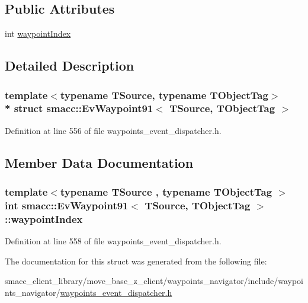 \subsection*{Public Attributes}
\begin{DoxyCompactItemize}
\item 
int \hyperlink{structsmacc_1_1EvWaypoint91_a104a2ec166f873d644de8a6fdc0253db}{waypoint\+Index}
\end{DoxyCompactItemize}


\subsection{Detailed Description}
\subsubsection*{template$<$typename T\+Source, typename T\+Object\+Tag$>$\\*
struct smacc\+::\+Ev\+Waypoint91$<$ T\+Source, T\+Object\+Tag $>$}



Definition at line 556 of file waypoints\+\_\+event\+\_\+dispatcher.\+h.



\subsection{Member Data Documentation}
\subsubsection[{\texorpdfstring{waypoint\+Index}{waypointIndex}}]{\setlength{\rightskip}{0pt plus 5cm}template$<$typename T\+Source , typename T\+Object\+Tag $>$ int {\bf smacc\+::\+Ev\+Waypoint91}$<$ T\+Source, T\+Object\+Tag $>$\+::waypoint\+Index}\hypertarget{structsmacc_1_1EvWaypoint91_a104a2ec166f873d644de8a6fdc0253db}{}\label{structsmacc_1_1EvWaypoint91_a104a2ec166f873d644de8a6fdc0253db}


Definition at line 558 of file waypoints\+\_\+event\+\_\+dispatcher.\+h.



The documentation for this struct was generated from the following file\+:\begin{DoxyCompactItemize}
\item 
smacc\+\_\+client\+\_\+library/move\+\_\+base\+\_\+z\+\_\+client/waypoints\+\_\+navigator/include/waypoints\+\_\+navigator/\hyperlink{waypoints__event__dispatcher_8h}{waypoints\+\_\+event\+\_\+dispatcher.\+h}\end{DoxyCompactItemize}
